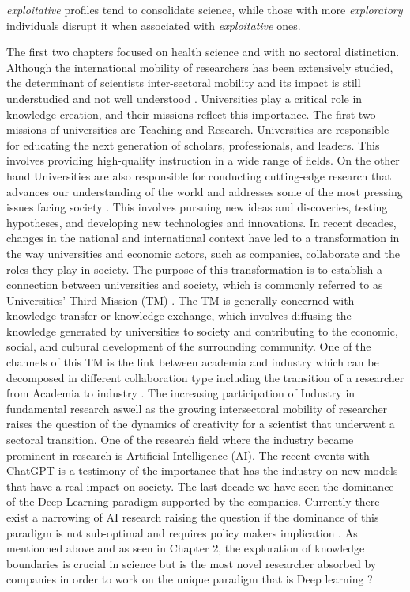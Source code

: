\textit{exploitative} profiles tend to consolidate science, while those with more \textit{exploratory} individuals disrupt it when associated with \textit{exploitative} ones. 



The first two chapters focused on health science and with no sectoral distinction. Although the international mobility of researchers has been extensively studied, the determinant of scientists inter-sectoral mobility and its impact is still understudied and not well understood \cite{geuna2015global}. Universities play a critical role in knowledge creation, and their missions reflect this importance. The first two missions of universities are Teaching and Research. Universities are responsible for educating the next generation of scholars, professionals, and leaders. This involves providing high-quality instruction in a wide range of fields. On the other hand Universities are also responsible for conducting cutting-edge research that advances our understanding of the world and addresses some of the most pressing issues facing society \citep{secundo2017intellectual}. This involves pursuing new ideas and discoveries, testing hypotheses, and developing new technologies and innovations. In recent decades, changes in the national and international context have led to a transformation in the way universities and economic actors, such as companies, collaborate and the roles they play in society. The purpose of this transformation is to establish a connection between universities and society, which is commonly referred to as Universities' Third Mission (TM) \citep{zomer2011rise,secundo2017intellectual,compagnucci2020third}. The TM is generally concerned with knowledge transfer or knowledge exchange, which involves diffusing the knowledge generated by universities to society and contributing to the economic, social, and cultural development of the surrounding community. One of the channels of this TM is the link between academia and industry which can be decomposed in different collaboration type including the transition of a researcher from Academia to industry \cite{ankrah2015universities}. The increasing participation of Industry in fundamental research aswell as the growing intersectoral mobility of researcher raises the question of the dynamics of creativity for a scientist that underwent a sectoral transition. One of the research field where the industry became prominent in research is Artificial Intelligence (AI). The recent events with ChatGPT is a testimony of the importance that has the industry on new models that have a real impact on society. The last decade we have seen the dominance of the Deep Learning paradigm supported by the companies. Currently there exist a narrowing of AI research raising the question if the dominance of this paradigm is not sub-optimal and requires policy makers implication \citep{klinger2020narrowing}. As mentionned above and as seen in Chapter 2, the exploration of knowledge boundaries is crucial in science but is the most novel researcher absorbed by companies in order to work on the unique paradigm that is Deep learning ? 

